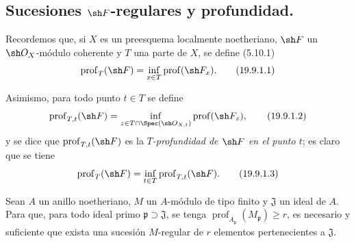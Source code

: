 
\subsection{\texorpdfstring{Sucesiones $\sh F$-regulares y profundidad.}{Sucesiones F-regulares y profundidad.}}
\label{subsection:IV.19.9}
\label{IV.19.9}



\begin{env}[19.9.1]
\label{IV.19.9.1}
Recordemos que, si $X$ es un preesquema localmente noetheriano, $\sh F$ un
$\sh O_X$-módulo coherente y $T$ una parte de $X$, se define (5.10.1)
\begin{equation}
  \operatorname{prof}_T(\sh F)=\inf_{x\in T}\operatorname{prof}(\sh F_x).
  \tag{19.9.1.1}\label{IV.19.9.1.1}
\end{equation}

Asimismo, para todo punto $t\in T$ se define
\begin{equation}
  \operatorname{prof}_{T,t}(\sh F)=\inf_{z\in T\cap\Spec(\sh O_{X,t})}\operatorname{prof}(\sh F_z),
  \tag{19.9.1.2}\label{IV.19.9.1.2}
\end{equation}
y se dice que $\operatorname{prof}_{T,t}(\sh F)$ es la
\emph{$T$-profundidad de $\sh F$ en el punto $t$}; es claro que se tiene
\begin{equation}
  \operatorname{prof}_T(\sh F)=\inf_{t\in T}\operatorname{prof}_{T,t}(\sh F).
  \tag{19.9.1.3}\label{IV.19.9.1.3}
\end{equation}
\end{env}

\begin{lemma}[19.9.2]
\label{IV.19.9.2}
Sean $A$ un anillo noetheriano, $M$ un $A$-módulo de tipo finito y
$\mathfrak J$ un ideal de $A$. Para que, para todo ideal primo
$\mathfrak p\supset\mathfrak J$, se tenga
$\operatorname{prof}_{A_{\mathfrak p}}(M_{\mathfrak p})\geq r$, es necesario
y suficiente que exista una sucesión $M$-regular de $r$ elementos
pertenecientes a $\mathfrak J$.
\end{lemma}

